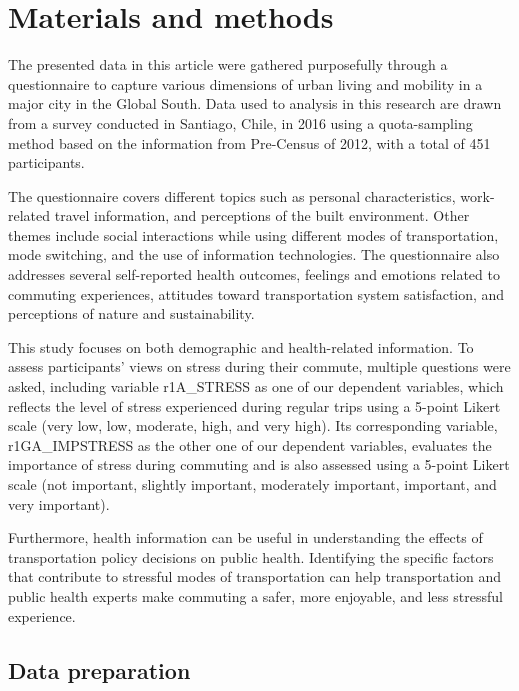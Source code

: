 \documentclass[
11pt, %
oneside, %
english, %
singlespacing, %
]{macthesis} %
\begin{document}
\hypertarget{materials-and-methods}{%
\section{Materials and methods}\label{materials-and-methods}}

The presented data in this article were gathered purposefully through a questionnaire to capture various dimensions of urban living and mobility in a major city in the Global South. Data used to analysis in this research are drawn from a survey conducted in Santiago, Chile, in 2016 using a quota-sampling method based on the information from Pre-Census of 2012, with a total of 451 participants.

The questionnaire covers different topics such as personal characteristics, work-related travel information, and perceptions of the built environment. Other themes include social interactions while using different modes of transportation, mode switching, and the use of information technologies. The questionnaire also addresses several self-reported health outcomes, feelings and emotions related to commuting experiences, attitudes toward transportation system satisfaction, and perceptions of nature and sustainability.

This study focuses on both demographic and health-related information. To assess participants' views on stress during their commute, multiple questions were asked, including variable r1A\_STRESS as one of our dependent variables, which reflects the level of stress experienced during regular trips using a 5-point Likert scale (very low, low, moderate, high, and very high). Its corresponding variable, r1GA\_IMPSTRESS as the other one of our dependent variables, evaluates the importance of stress during commuting and is also assessed using a 5-point Likert scale (not important, slightly important, moderately important, important, and very important).

Furthermore, health information can be useful in understanding the effects of transportation policy decisions on public health. Identifying the specific factors that contribute to stressful modes of transportation can help transportation and public health experts make commuting a safer, more enjoyable, and less stressful experience.

\hypertarget{data-preparation}{%
\subsection{Data preparation}\label{data-preparation}}
\end{document}
